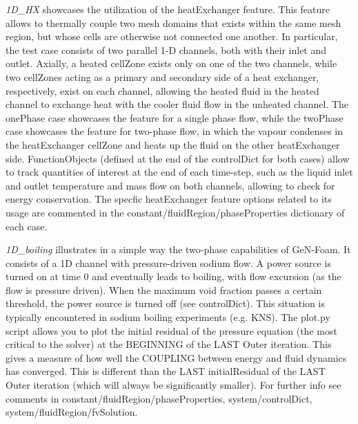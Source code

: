 \begin{DoxyItemize}
\item {\itshape 1\+D\+\_\+\+HX} showcases the utilization of the heat\+Exchanger feature. This feature allows to thermally couple two mesh domains that exists within the same mesh region, but whose cells are otherwise not connected one another. In particular, the test case consists of two parallel 1-\/D channels, both with their inlet and outlet. Axially, a heated cell\+Zone exists only on one of the two channels, while two cell\+Zones acting as a primary and secondary side of a heat exchanger, respectively, exist on each channel, allowing the heated fluid in the heated channel to exchange heat with the cooler fluid flow in the unheated channel. The one\+Phase case showcases the feature for a single phase flow, while the two\+Phase case showcases the feature for two-\/phase flow, in which the vapour condenses in the heat\+Exchanger cell\+Zone and heats up the fluid on the other heat\+Exchanger side. Function\+Objects (defined at the end of the control\+Dict for both cases) allow to track quantities of interest at the end of each time-\/step, such as the liquid inlet and outlet temperature and mass flow on both channels, allowing to check for energy conservation. The specfic heat\+Exchanger feature options related to its usage are commented in the constant/fluid\+Region/phase\+Properties dictionary of each case.
\item {\itshape 1\+D\+\_\+boiling} illustrates in a simple way the two-\/phase capabilities of Ge\+N-\/\+Foam. It consists of a 1D channel with pressure-\/driven sodium flow. A power source is turned on at time 0 and eventually leads to boiling, with flow excursion (as the flow is pressure driven). When the maximum void fraction passes a certain threshold, the power source is turned off (see control\+Dict). This situation is typically encountered in sodium boiling experiments (e.\+g. K\+NS). The plot.\+py script allows you to plot the initial residual of the pressure equation (the most critical to the solver) at the B\+E\+G\+I\+N\+N\+I\+NG of the L\+A\+ST Outer iteration. This gives a measure of how well the C\+O\+U\+P\+L\+I\+NG between energy and fluid dynamics has converged. This is different than the L\+A\+ST initial\+Residual of the L\+A\+ST Outer iteration (which will always be significantly smaller). For further info see comments in constant/fluid\+Region/phase\+Properties, system/control\+Dict, system/fluid\+Region/fv\+Solution.

\end{DoxyItemize}
